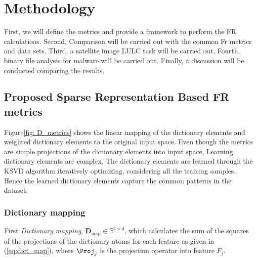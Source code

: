 \section{Methodology}

First, we will define the metrics and provide a framework to perform the FR calculations. Second, Comparison will be carried out with the common Fr metrics and data sets. Third, a satellite image LULC task will be carried out. Fourth, binary file analysis for malware will be carried out. Finally, a discussion will be conducted comparing the results.

\subsection{Proposed Sparse Representation Based FR metrics}

Figure\ref{fig: D_metrics} shows the linear mapping of the dictionary elements and weighted dictionary elements to the original input space. Even though the metrics are simple projections of the dictionary elements into input space, Learning dictionary elements are complex. The dictionary elements are learned through the KSVD algorithm iteratively optimizing, considering all the training samples. Hence the learned dictionary elements capture the common patterns in the dataset. 


\begin{figure*}[!t]%
\centering
{}\label{subfig: D_map}%
\qquad
{}%
\label{subfig: D_util}
\caption{Projection of dictionary elements and weights into input space. (a) \textit{dictionary mapping} only projects the dictionary atoms. (b) \textit{dictionary utilization} projects the weighted dictionary atoms according to the sparse representation.}%
\label{fig: D_metrics}%
\end{figure*}


\subsubsection{Dictionary mapping}

First \textit{Dictionary mapping}, $\mathbf{D}_\textrm{map} \in \mathbb{R}^{1 \times d}$, which calculates the sum of the squares of the projections of the dictionary atoms for each feature as given in (\ref{eq:dict_map}), where $\Proj_j$ is the projection operator into feature $F_j$. 

